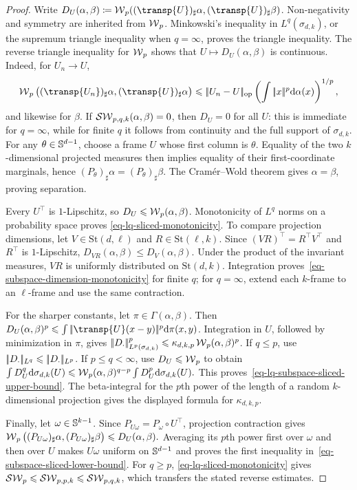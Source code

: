 \begin{proof}
Write
$D_U(\alpha,\beta)\eqdef
\Wass_p((\transp{U})_\sharp\alpha,(\transp{U})_\sharp\beta)$.
Non-negativity and symmetry are inherited from $\operatorname{\mathcal{W}}_p$.
Minkowski's inequality in $L^q(\sigma_{d,k})$, or the supremum triangle
inequality when $q=\infty$, proves the triangle inequality. The reverse
triangle inequality for $\operatorname{\mathcal{W}}_p$ shows that $U\mapsto D_U(\alpha,\beta)$ is
continuous. Indeed, for $U_n\to U$,
\[
\Wass_p\big((\transp{U_n})_\sharp\alpha,(\transp{U})_\sharp\alpha\big)
\leq
\norm{U_n-U}_{\mathrm{op}}
\left(\int\norm{x}^p\d\alpha(x)\right)^{1/p},
\]
and likewise for $\beta$. If $\operatorname{\mathcal{SW}}_{p,q,k}(\alpha,\beta)=0$, then $D_U=0$ for
all $U$: this is immediate for $q=\infty$, while for finite $q$ it follows
from continuity and the full support of $\sigma_{d,k}$. For any
$\theta\in\mathbb{S}^{d-1}$, choose a frame $U$ whose first column is $\theta$.
Equality of the two $k$-dimensional projected measures then implies equality
of their first-coordinate marginals, hence
$(P_\theta)_\sharp\alpha=(P_\theta)_\sharp\beta$. The Cram\'er--Wold theorem
gives $\alpha=\beta$, proving separation.

Every $U^\top$ is $1$-Lipschitz, so $D_U\leqslant\operatorname{\mathcal{W}}_p(\alpha,\beta)$.
Monotonicity of $L^q$ norms on a probability space proves
\eqref{eq-lq-sliced-monotonicity}. To compare projection dimensions, let
$V\in\mathrm{St}(d,\ell)$ and $R\in\mathrm{St}(\ell,k)$. Since
$(VR)^\top=R^\top V^\top$ and $R^\top$ is $1$-Lipschitz,
$D_{VR}(\alpha,\beta)\leq D_V(\alpha,\beta)$. Under the product of the
invariant measures, $VR$ is uniformly distributed on $\mathrm{St}(d,k)$.
Integration proves~\eqref{eq-subspace-dimension-monotonicity} for finite $q$;
for $q=\infty$, extend each $k$-frame to an $\ell$-frame and use the same
contraction.

For the sharper constants, let $\pi\in\Gamma(\alpha,\beta)$. Then
$D_U(\alpha,\beta)^p \leq \int\norm{\transp{U}(x-y)}^p\d\pi(x,y)$.
Integration in $U$, followed by minimization in $\pi$, gives
$|\!| D_\cdot |\!|_{L^p(\sigma_{d,k})}^p
\leqslant\kappa_{d,k,p}\operatorname{\mathcal{W}}_p(\alpha,\beta)^p$. If $q\leq p$, use
$|\!| D_\cdot |\!|_{L^q}\leqslant|\!| D_\cdot |\!|_{L^p}$. If $p\leq q<\infty$, use
$D_U\leqslant\operatorname{\mathcal{W}}_p$ to obtain
\(\int D_U^q\mathrm{d}\sigma_{d,k}(U) \leqslant \operatorname{\mathcal{W}}_p(\alpha,\beta)^{q-p} \int D_U^p\mathrm{d}\sigma_{d,k}(U).\)
This proves~\eqref{eq-lq-subspace-sliced-upper-bound}. The beta-integral for
the $p$th power of the length of a random $k$-dimensional projection gives
the displayed formula for $\kappa_{d,k,p}$.

Finally, let $\omega\in\mathbb{S}^{k-1}$. Since
$P_{U\omega}=P_\omega\circ U^\top$, projection contraction gives \(\operatorname{\mathcal{W}}_p\big((P_{U\omega})_\sharp\alpha, (P_{U\omega})_\sharp\beta\big) \leqslant D_U(\alpha,\beta).\)
Averaging its $p$th power first over $\omega$ and then over $U$ makes
$U\omega$ uniform on $\mathbb{S}^{d-1}$ and proves the first inequality
in~\eqref{eq-subspace-sliced-lower-bound}. For $q\geq p$,
\eqref{eq-lq-sliced-monotonicity} gives
$\operatorname{\mathcal{SW}}_p\leqslant\operatorname{\mathcal{SW}}_{p,p,k}\leqslant\operatorname{\mathcal{SW}}_{p,q,k}$, which transfers the stated reverse
estimates.


\end{proof}
